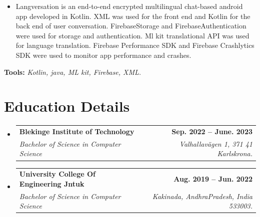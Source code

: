 \documentclass[letterpaper,11pt]{article}
\makeatletter
\newcommand{\resumeItem}[1]{
  \item\small{
    {#1 \vspace{-2pt}}
  }
}
\newcommand{\resumeSubheading}[4]{
  \vspace{-2pt}\item
    \begin{tabular*}{1.0\textwidth}[t]{l@{\extracolsep{\fill}}r}
      \textbf{#1} & \textbf{\small #2} \\
      \textit{\small#3} & \textit{\small #4} \\
    \end{tabular*}\vspace{-7pt}
}
\newcommand{\resumeSubHeadingListStart}{\begin{itemize}[leftmargin=0.0in, label={}]}
\newcommand{\resumeSubHeadingListEnd}{\end{itemize}}
\newcommand{\resumeItemListStart}{\begin{itemize}}
\newcommand{\resumeItemListEnd}{\end{itemize}\vspace{-5pt}}
\makeatother
\begin{document}
          \vspace{-8pt}
          \resumeItemListStart
          \resumeItem{Langversation is an end-to-end encrypted multilingual chat-based android app developed in Kotlin. XML was used for the front end and Kotlin for the back end of user conversation. FirebaseStorage and FirebaseAuthentication were used for storage and authentication. Ml kit translational API was used for language translation. Firebase Performance SDK and Firebase Crashlytics SDK were used to monitor app performance and crashes.}
          \resumeItemListEnd 
          \textbf{Tools:}\emph{
Kotlin, java, ML kit, Firebase, XML.}


                

\section{Education Details  \faGraduationCap   }

 
  \resumeSubHeadingListStart
    \resumeSubheading
      {Blekinge Institute of Technology}{Sep. 2022 -- June. 2023}
      {Bachelor of Science in Computer Science}{\faMapMarker Valhallavägen 1, 371 41 Karlskrona.}
  \resumeSubHeadingListEnd
    \vspace{-7pt}
  \resumeSubHeadingListStart
    \resumeSubheading
      {University College Of Engineering Jntuk}{Aug. 2019 -- Jun. 2022}
      {Bachelor of Science in Computer Science}{\faMapMarker Kakinada, AndhraPradesh, India 533003.}
  \resumeSubHeadingListEnd


\end{document}
